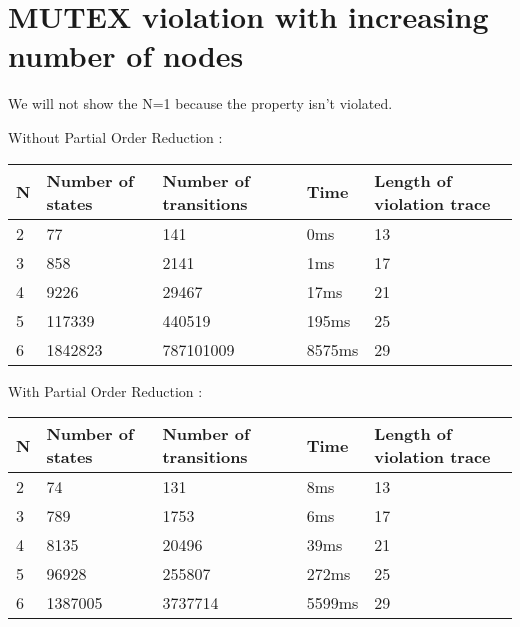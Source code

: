 \section{MUTEX violation with increasing number of nodes}

We will not show the N=1 because the property isn't violated. \newline

Without Partial Order Reduction :

\bigskip
\begin{tabular}{l|l|l|l|l}
    N & Number of states & Number of transitions & Time & Length of violation trace \\
    \hline
    2 & 77               & 141                   & 0ms  & 13 \\
    3 & 858              & 2141                  & 1ms  & 17 \\
    4 & 9226             & 29467                 & 17ms & 21 \\
    5 & 117339           & 440519                & 195ms & 25 \\
    6 & 1842823          & 787101009               & 8575ms & 29 \\
\end{tabular}
\bigskip

With Partial Order Reduction :

\bigskip
\begin{tabular}{l|l|l|l|l}
    N & Number of states & Number of transitions & Time & Length of violation trace \\
    \hline
    2 & 74               & 131                   & 8ms   & 13 \\
    3 & 789              & 1753                  & 6ms   & 17 \\
    4 & 8135             & 20496                 & 39ms  & 21 \\
    5 & 96928            & 255807                & 272ms & 25 \\
    6 & 1387005          & 3737714               & 5599ms & 29 \\
\end{tabular}
